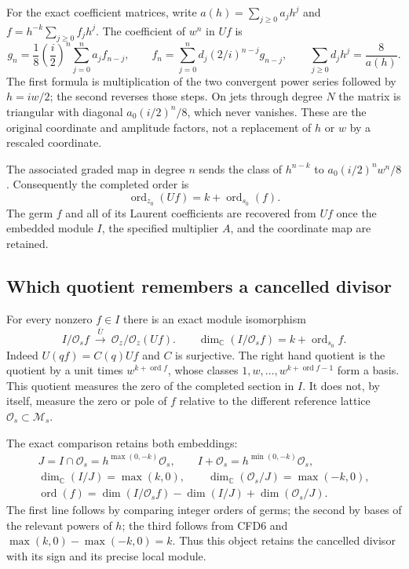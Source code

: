 For the exact coefficient matrices, write
$a(h)=\sum_{j\ge0}a_jh^j$ and
$f=h^{-k}\sum_{j\ge0}f_jh^j$. The coefficient of $w^n$ in $Uf$ is
\begin{equation}\tag{CFD4}
 g_n=\frac18\left(\frac i2\right)^n
            \sum_{j=0}^n a_j f_{n-j},\qquad
 f_n=\sum_{j=0}^n d_j(2/i)^{n-j}g_{n-j},\qquad
 \sum_{j\ge0}d_jh^j=\frac8{a(h)}.
\end{equation}
The first formula is multiplication of the two convergent power
series followed by $h=iw/2$; the second reverses those steps. On
jets through degree $N$ the matrix is triangular with diagonal
$a_0(i/2)^n/8$, which never vanishes. These are the original coordinate
and amplitude factors, not a replacement of $h$ or $w$ by a rescaled
coordinate.

The associated graded map in degree $n$ sends the class of
$h^{n-k}$ to $a_0(i/2)^n w^n/8$. Consequently the completed order is
\begin{equation}\tag{CFD5}
 \operatorname{ord}_{z_0}(Uf)=k+\operatorname{ord}_{s_0}(f).
\end{equation}
The germ $f$ and all of its Laurent coefficients are recovered from
$Uf$ once the embedded module $I$, the specified multiplier $A$, and
the coordinate map are retained.

\subsection{Which quotient remembers a cancelled divisor}

For every nonzero $f\in I$ there is an exact module isomorphism
\begin{equation}\tag{CFD6}
 I/\mathcal O_s f\ \xrightarrow{\ \overline U\ }\
 \mathcal O_z/\mathcal O_z(Uf).
 \qquad
 \dim_{\mathbb C}(I/\mathcal O_s f)
       =k+\operatorname{ord}_{s_0}f.
\end{equation}
Indeed $U(qf)=C(q)Uf$ and $C$ is surjective. The right hand quotient
is the quotient by a unit times $w^{k+\operatorname{ord}f}$, whose
classes $1,w,\ldots,w^{k+\operatorname{ord}f-1}$ form a basis.
This quotient measures the zero of the completed section in $I$.
It does not, by itself, measure the zero or pole of $f$ relative to
the different reference lattice $\mathcal O_s\subset\mathcal M_s$.

The exact comparison retains both embeddings:
\begin{equation}\tag{CFD7}
\begin{gathered}
 J=I\cap\mathcal O_s=h^{\max(0,-k)}\mathcal O_s,\qquad
 I+\mathcal O_s=h^{\min(0,-k)}\mathcal O_s,\\
 \dim_{\mathbb C}(I/J)=\max(k,0),\qquad
 \dim_{\mathbb C}(\mathcal O_s/J)=\max(-k,0),\\
 \operatorname{ord}(f)
 =\dim(I/\mathcal O_s f)-\dim(I/J)+\dim(\mathcal O_s/J).
\end{gathered}
\end{equation}
The first line follows by comparing integer orders of germs; the
second by bases of the relevant powers of $h$; the third follows
from CFD6 and $\max(k,0)-\max(-k,0)=k$. Thus this object retains
the cancelled divisor with its sign and its precise local module.

